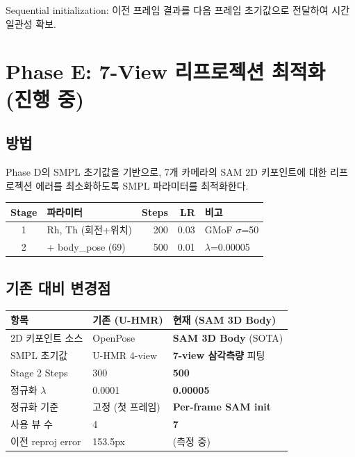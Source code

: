 \documentclass[11pt, a4paper]{article}
\begin{document}
Sequential initialization: 이전 프레임 결과를 다음 프레임 초기값으로 전달하여 시간 일관성 확보.

\section{Phase E: 7-View 리프로젝션 최적화 (진행 중)}

\subsection{방법}

Phase D의 SMPL 초기값을 기반으로, 7개 카메라의 SAM 2D 키포인트에 대한 리프로젝션 에러를 최소화하도록 SMPL 파라미터를 최적화한다.

\begin{center}
\begin{tabular}{c l r r l}
\toprule
\textbf{Stage} & \textbf{파라미터} & \textbf{Steps} & \textbf{LR} & \textbf{비고} \\
\midrule
1 & Rh, Th (회전+위치) & 200 & 0.03 & GMoF $\sigma$=50 \\
2 & + body\_pose (69) & 500 & 0.01 & $\lambda$=0.00005 \\
\bottomrule
\end{tabular}
\end{center}

\subsection{기존 대비 변경점}

\begin{center}
\begin{tabular}{l l l}
\toprule
\textbf{항목} & \textbf{기존 (U-HMR)} & \textbf{현재 (SAM 3D Body)} \\
\midrule
2D 키포인트 소스 & OpenPose & \textbf{SAM 3D Body} (SOTA) \\
SMPL 초기값 & U-HMR 4-view & \textbf{7-view 삼각측량} 피팅 \\
Stage 2 Steps & 300 & \textbf{500} \\
정규화 $\lambda$ & 0.0001 & \textbf{0.00005} \\
정규화 기준 & 고정 (첫 프레임) & \textbf{Per-frame SAM init} \\
사용 뷰 수 & 4 & \textbf{7} \\
이전 reproj error & 153.5px & (측정 중) \\
\bottomrule
\end{tabular}
\end{center}
\end{document}
